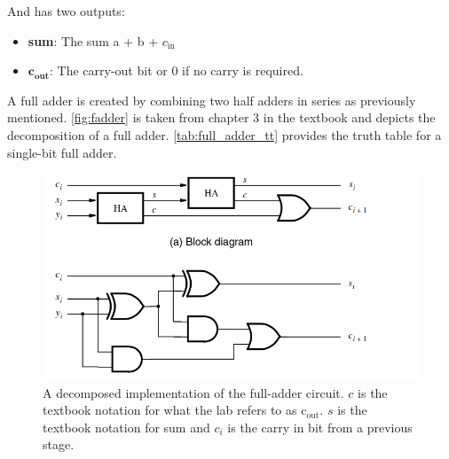 \documentclass[12pt]{labmanual}
\begin{document}
And has two outputs:

\begin{itemize}
    \item \textbf{sum}: The sum a + b + $c_\text{in}$
    \item $\textbf{c}_\textbf{out}$: The carry-out bit or 0 if no carry is required.
\end{itemize}

A full adder is created by combining two half adders in series as previously mentioned. \autoref{fig:fadder} is taken from chapter 3 in the textbook and depicts the decomposition of a full adder. \autoref{tab:full_adder_tt} provides the truth table for a single-bit full adder.
\begin{figure}
    \centering
    \includegraphics[width=1\linewidth]{fulladderdiagram.png}
    \caption{A decomposed implementation of the full-adder circuit. $c$ is the textbook notation for what the lab refers to as $\text{c}_\text{out}$. $s$ is the textbook notation for sum and $c_i$ is the carry in bit from a previous stage.}
    \label{fig:fadder}
\end{figure}
\end{document}
